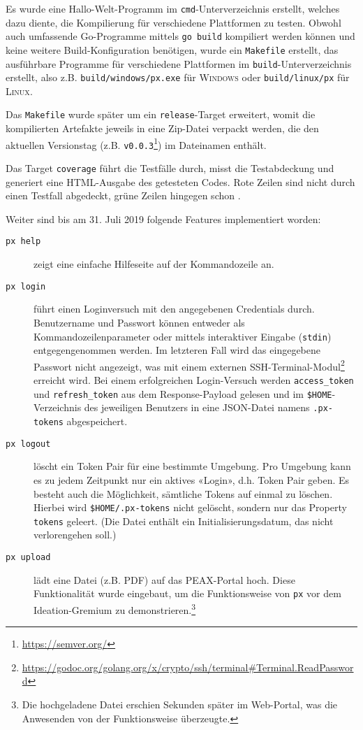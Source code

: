Es wurde eine Hallo-Welt-Programm im \texttt{cmd}-Unterverzeichnis \cite[p. 293]{gopl} erstellt, welches dazu diente, die Kompilierung für verschiedene Plattformen zu testen. Obwohl auch umfassende Go-Programme mittels \texttt{go build} kompiliert werden können und keine weitere Build-Konfiguration benötigen, wurde ein \texttt{Makefile} erstellt, das ausführbare Programme für verschiedene Plattformen im \texttt{build}-Unter\-ver\-zeich\-nis erstellt, also z.B. \texttt{build/windows/px.exe} für \textsc{Windows} oder \texttt{build/linux/px} für \textsc{Linux}.

Das \texttt{Makefile} wurde später um ein \texttt{release}-Target erweitert, womit die kompilierten Artefakte jeweils in eine Zip-Datei verpackt werden, die den aktuellen Versionstag (z.B. \texttt{v0.0.3}\footnote{\url{https://semver.org/}}) im Dateinamen enthält.

Das Target \texttt{coverage} führt die Testfälle durch, misst die Testabdeckung und generiert eine HTML-Ausgabe des getesteten Codes. Rote Zeilen sind nicht durch einen Testfall abgedeckt, grüne Zeilen hingegen schon \cite[Kapitel 11.3]{gopl}.

Weiter sind bis am 31. Juli 2019 folgende Features implementiert worden:

\begin{description}
	\item[\texttt{px help}] zeigt eine einfache Hilfeseite auf der Kommandozeile an.
    \item[\texttt{px login}] führt einen Loginversuch mit den angegebenen Credentials durch. Benutzername und Passwort können entweder als Kommandozeilenparameter oder mittels interaktiver Eingabe (\texttt{stdin}) entgegengenommen werden. Im letzteren Fall wird das eingegebene Passwort nicht angezeigt, was mit einem externen SSH-Ter\-mi\-nal-Modul\footnote{\url{https://godoc.org/golang.org/x/crypto/ssh/terminal\#Terminal.ReadPassword}} erreicht wird. Bei einem erfolgreichen Login-Versuch werden \texttt{access\_token} und \texttt{refresh\_token} aus dem Response-Payload gelesen und im \texttt{\$HOME}-Ver\-zeich\-nis des jeweiligen Benutzers in eine JSON-Datei namens \texttt{.px-tokens} abgespeichert.
	\item[\texttt{px logout}] löscht ein Token Pair für eine bestimmte Umgebung. Pro Umgebung kann es zu jedem Zeitpunkt nur ein aktives «Login», d.h. Token Pair geben. Es besteht auch die Möglichkeit, sämtliche Tokens auf einmal zu löschen. Hierbei wird \texttt{\$HOME/.px-tokens} nicht gelöscht, sondern nur das Property \texttt{tokens} geleert. (Die Datei enthält ein Initialisierungsdatum, das nicht verlorengehen soll.)
	\item[\texttt{px upload}] lädt eine Datei (z.B. PDF) auf das PEAX-Portal hoch. Diese Funktionalität wurde eingebaut, um die Funktionsweise von \texttt{px} vor dem Ideation-Gremium zu demonstrieren.\footnote{Die hochgeladene Datei erschien Sekunden später im Web-Portal, was die Anwesenden von der Funktionsweise überzeugte.}
\end{description}

